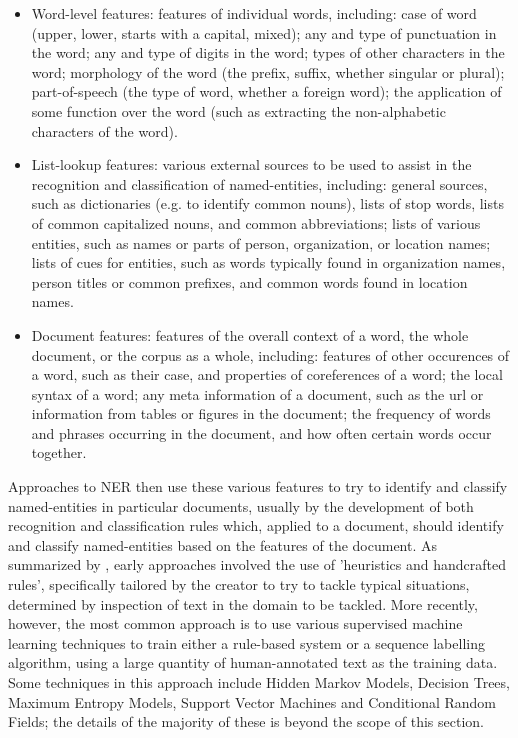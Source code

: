 \documentclass[12pt, a4paper]{report}
\begin{document}
\begin{itemize}
	\item {Word-level features: features of individual words, including: case of word (upper, lower, starts with a capital, mixed); any and type of punctuation in the word; any and type of digits in the word; types of other characters in the word; morphology of the word (the prefix, suffix, whether singular or plural); part-of-speech (the type of word, whether a foreign word); the application of some function over the word (such as extracting the non-alphabetic characters of the word).}
	\item {List-lookup features: various external sources to be used to assist in the recognition and classification of named-entities, including: general sources, such as dictionaries (e.g. to identify common nouns), lists of stop words, lists of common capitalized nouns, and common abbreviations; lists of various entities, such as names or parts of person, organization, or location names; lists of cues for entities, such as words typically found in organization names, person titles or common prefixes, and common words found in location names.}
	\item {Document features: features of the overall context of a word, the whole document, or the corpus as a whole, including: features of other occurences of a word, such as their case, and properties of coreferences of a word; the local syntax of a word; any meta information of a document, such as the url or information from tables or figures in the document; the frequency of words and phrases occurring in the document, and how often certain words occur together.}
\end{itemize}

Approaches to NER then use these various features to try to identify and classify named-entities in particular documents, usually by the  development of both recognition and classification rules which, applied to a document, should identify and classify named-entities based on the features of the document. As summarized by \citet{nadeau2009}, early approaches involved the use of 'heuristics and handcrafted rules', specifically tailored by the creator to try to tackle typical situations, determined by inspection of text in the domain to be tackled. More recently, however, the most common approach is to use various supervised machine learning techniques to train either a rule-based system or a sequence labelling algorithm, using a large quantity of human-annotated text as the training data. Some techniques in this approach include Hidden Markov Models, Decision Trees, Maximum Entropy Models, Support Vector Machines and Conditional Random Fields; the details of the majority of these is beyond the scope of this section.
\end{document}

